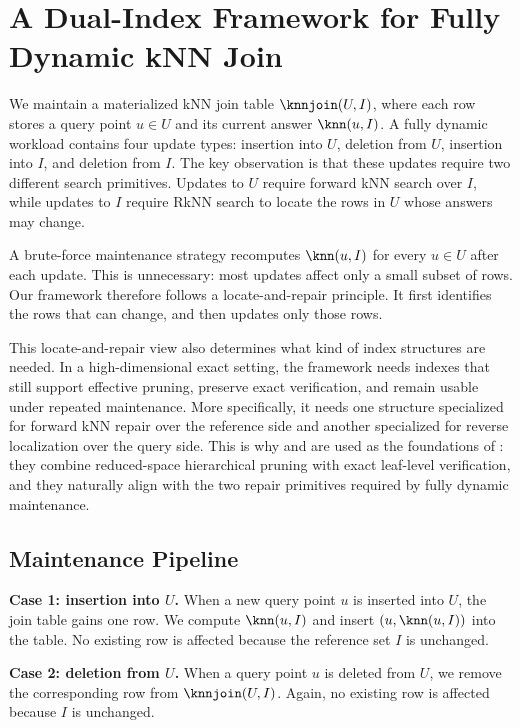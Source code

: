 \section{A Dual-Index Framework for Fully Dynamic kNN Join}
\label{sec:framework}

We maintain a materialized kNN join table $\knnjoin(U,I)$, where each row stores a query point $u\in U$ and its current answer $\knn(u,I)$. A fully dynamic workload contains four update types: insertion into $U$, deletion from $U$, insertion into $I$, and deletion from $I$. The key observation is that these updates require two different search primitives. Updates to $U$ require forward kNN search over $I$, while updates to $I$ require RkNN search to locate the rows in $U$ whose answers may change.

A brute-force maintenance strategy recomputes $\knn(u,I)$ for every $u\in U$ after each update. This is unnecessary: most updates affect only a small subset of rows. Our framework therefore follows a locate-and-repair principle. It first identifies the rows that can change, and then updates only those rows.

This locate-and-repair view also determines what kind of index structures are needed. In a high-dimensional exact setting, the framework needs indexes that still support effective pruning, preserve exact verification, and remain usable under repeated maintenance. More specifically, it needs one structure specialized for forward kNN repair over the reference side and another specialized for reverse localization over the query side. This is why \deltatree and \hdrtree are used as the foundations of \dualtree: they combine reduced-space hierarchical pruning with exact leaf-level verification, and they naturally align with the two repair primitives required by fully dynamic maintenance.

\subsection{Maintenance Pipeline}
\label{subsec:pipeline}

\noindent\textbf{Case 1: insertion into $U$.}
When a new query point $u$ is inserted into $U$, the join table gains one row. We compute $\knn(u,I)$ and insert $(u,\knn(u,I))$ into the table. No existing row is affected because the reference set $I$ is unchanged.

\noindent\textbf{Case 2: deletion from $U$.}
When a query point $u$ is deleted from $U$, we remove the corresponding row from $\knnjoin(U,I)$. Again, no existing row is affected because $I$ is unchanged.


